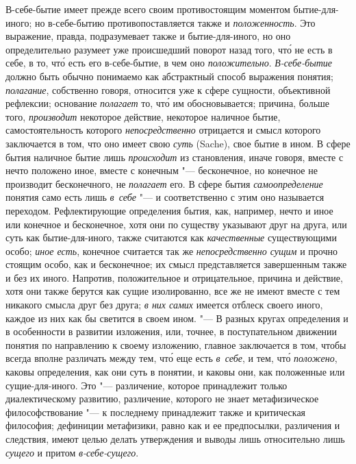 В-себе-бытие имеет прежде всего своим противостоящим моментом
бытие-для-иного; но в-себе-бытию противопоставляется также и
{\em положенность}. Это выражение, правда,
подразумевает также и бытие-для-иного, но оно определительно разумеет уже
происшедший поворот назад того, чт\'{о} не есть в себе, в то, чт\'{о} есть его
в-себе-бытие, в чем оно {\em положительно}.
{\em В-себе-бытие} должно быть обычно понимаемо как
абстрактный способ выражения понятия; {\em полагание},
собственно говоря, относится уже к сфере сущности, объективной рефлексии;
основание {\em полагает} то, чт\'{о} им обосновывается;
причина, больше того, {\em производит} некоторое
действие, некоторое наличное бытие, самостоятельность которого
{\em непосредственно} отрицается и смысл которого
заключается в том, что оно имеет свою {\em суть}
(Sache), свое бытие в ином. В сфере бытия наличное бытие лишь
{\em происходит} из становления, иначе говоря, вместе с нечто
положено иное, вместе с конечным "--- бесконечное, но конечное не
производит бесконечного, не {\em полагает} его. В сфере
бытия {\em самоопределение} понятия само есть лишь
{\em в~себе} "--- и соответственно с этим оно называется
переходом. Рефлектирующие определения бытия, как, например, нечто и иное
или конечное и бесконечное, хотя они по существу указывают друг на друга,
или суть как бытие-для-иного, также считаются как
{\em качественные} существующими особо;
{\em иное есть}, конечное считается так же
{\em непосредственно сущим} и прочно стоящим особо, как
и бесконечное; их смысл представляется завершенным также и без их иного.
Напротив, положительное и отрицательное, причина и действие, хотя они также
берутся как сущие изолированно, все же не имеют вместе с тем никакого
смысла друг без друга; {\em в них самих} имеется
отблеск своего иного, каждое из них как бы светится в своем ином. "--- В
разных кругах определения и в особенности в развитии
изложения, или, точнее, в поступательном движении понятия по направлению к
своему изложению, главное заключается в том, чтобы всегда вполне различать
между тем, чт\'{о} еще есть {\em в~себе}, и тем, чт\'{о}
{\em положено}, каковы определения, как они суть в
понятии, и каковы они, как положенные или сущие-для-иного. Это
"--- различение, которое принадлежит только диалектическому развитию,
различение, которого не знает метафизическое философствование "--- к
последнему принадлежит также и критическая философия; дефиниции метафизики,
равно как и ее предпосылки, различения и следствия, имеют целью делать
утверждения и выводы лишь относительно лишь {\em сущего} и
притом {\em в-себе-сущего}.

